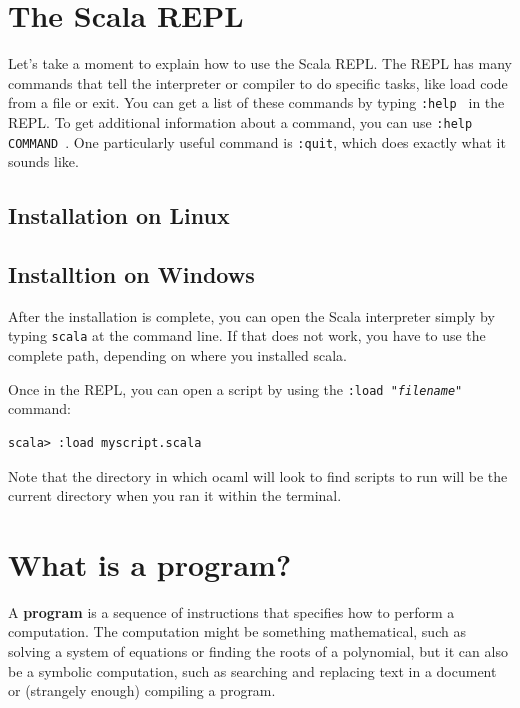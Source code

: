 \documentclass[10pt]{book}
\begin{document}
\section{The Scala REPL}

Let's take a moment to explain how to use the Scala REPL. The REPL has many commands that tell the
interpreter or compiler to do specific tasks, like load code from a file or exit. You can get a list
of these commands by typing {\tt \verb ":help" } in the REPL. To get additional information about a
command, you can use {\tt \verb ":help COMMAND" }. One particularly useful command is
{\tt \verb":quit"}, which does exactly what it sounds like.


\subsection{Installation on Linux}

\subsection{Installtion on Windows}


After the installation is complete, you can open the Scala interpreter simply by typing {\tt scala}
at the command line. If that does not work, you have to use the complete path, depending on where you
installed scala.

Once in the REPL, you can open a script by using the {\tt :load "{\it filename}"} command:

\beforeverb
\begin{verbatim}
scala> :load myscript.scala
\end{verbatim}
\afterverb

Note that the directory in which ocaml will look to find scripts to run will be the current directory
when you ran it within the terminal.

\section{What is a program?}

A {\bf program} is a sequence of instructions that specifies how to perform a computation.  The computation 
might be something mathematical, such as solving a system of equations or finding the roots of a polynomial, 
but it can also be a symbolic computation, such as searching and replacing text in a document or (strangely 
enough) compiling a program.
\end{document}
